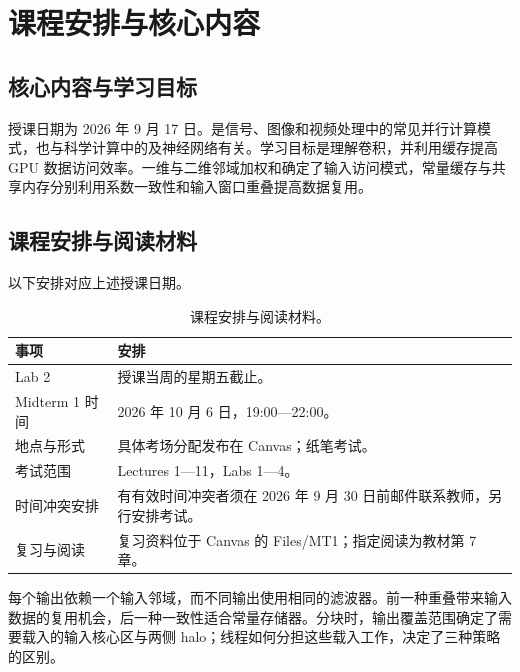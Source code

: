 \section{课程安排与核心内容}
\subsection{核心内容与学习目标}
授课日期为 2026 年 9 月 17 日。是信号、图像和视频处理中的常见并行计算模式，也与科学计算中的及神经网络有关。学习目标是理解卷积，并利用缓存提高 GPU 数据访问效率。一维与二维邻域加权和确定了输入访问模式，常量缓存与共享内存分别利用系数一致性和输入窗口重叠提高数据复用。

\subsection{课程安排与阅读材料}
以下安排对应上述授课日期。

\begin{table}[H]
\centering\small
\begin{tabularx}{\textwidth}{@{}p{}Y@{}}
\toprule
事项 & 安排 \\
\midrule
Lab 2 & 授课当周的星期五截止。\\
Midterm 1 时间 & 2026 年 10 月 6 日，19:00—22:00。\\
地点与形式 & 具体考场分配发布在 Canvas；纸笔考试。\\
考试范围 & Lectures 1—11，Labs 1—4。\\
时间冲突安排 & 有有效时间冲突者须在 2026 年 9 月 30 日前邮件联系教师，另行安排考试。\\
复习与阅读 & 复习资料位于 Canvas 的 Files/MT1；指定阅读为教材第 7 章。\\
\bottomrule
\end{tabularx}
\caption*{课程安排与阅读材料。}
\end{table}

\begin{keybox}[title={核心关系}]
每个输出依赖一个输入邻域，而不同输出使用相同的滤波器。前一种重叠带来输入数据的复用机会，后一种一致性适合常量存储器。分块时，输出覆盖范围确定了需要载入的输入核心区与两侧 halo；线程如何分担这些载入工作，决定了三种策略的区别。
\end{keybox}

